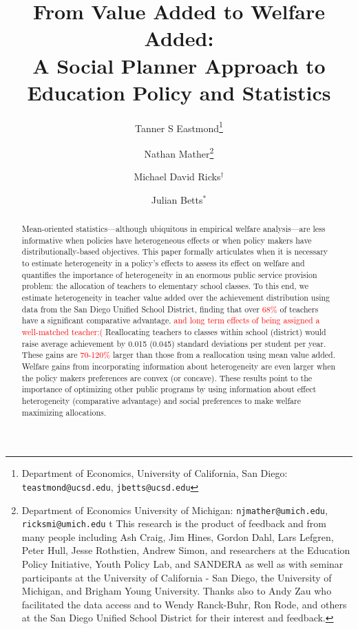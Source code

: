 \documentclass[12pt]{article}
\title{From Value Added to Welfare Added: \\ A Social Planner Approach to Education Policy and Statistics}
\author{Tanner S Eastmond\thanks{Department of Economics, University of California, San Diego: \texttt{teastmond@ucsd.edu}, \texttt{jbetts@ucsd.edu}} \and Nathan Mather\thanks{Department of Economics University of Michigan: \texttt{njmather@umich.edu}, \texttt{ricksmi@umich.edu} \hspace{11em} {\color{white}t} This research is the product of feedback and from many people including Ash Craig, Jim Hines, Gordon Dahl, Lars Lefgren, Peter Hull, Jesse Rothstien,  Andrew Simon, and  researchers at the Education Policy Initiative, Youth Policy Lab, and SANDERA as well as with seminar participants at the University of California - San Diego, the University of Michigan, and Brigham Young University. Thanks also to Andy Zau who facilitated the data access and to  Wendy Ranck-Buhr, Ron Rode, and others at the San Diego Unified School District for their interest and feedback.} \and Michael David Ricks$^\dagger$ \and Julian Betts$^*$}
\theoremstyle{definition}
\theoremstyle{definition}
\theoremstyle{definition}
\theoremstyle{definition}
\begin{document}
\maketitle

\begin{abstract}
Mean-oriented statistics---although ubiquitous in empirical welfare analysis---are less informative when policies have heterogeneous effects or when policy makers have distributionally-based objectives. This paper formally articulates when it is necessary to estimate heterogeneity in a policy's effects to assess its effect on welfare and quantifies the importance of heterogeneity in an enormous public service provision problem: the allocation of teachers to elementary school classes. %
To this end, we estimate heterogeneity in teacher value added over the achievement distribution using data from the San Diego Unified School District, finding that over \textcolor{red}{68\%} of teachers have a significant comparative advantage. \textcolor{red}{and long term effects of being assigned a well-matched teacher:( } Reallocating teachers to classes within school (district) would raise average achievement by 0.015 (0.045) standard deviations per student per year. These gains are \textcolor{red}{70-120\%} larger than those from a reallocation using mean value added. Welfare gains from incorporating information about heterogeneity are even larger when the policy makers preferences are convex (or concave). These results point to the importance of optimizing other public programs by using information about effect heterogeneity (comparative advantage) and social preferences to make welfare maximizing allocations.


\end{abstract}
\end{document}
